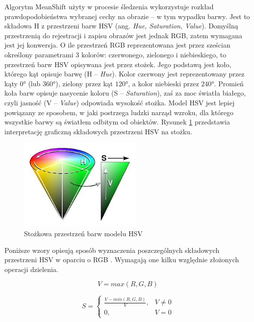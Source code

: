 Algorytm MeanShift użyty w procesie śledzenia wykorzystuje rozkład prawdopodobieństwa wybranej cechy na obrazie -- w tym wypadku barwy. 
Jest to składowa H z przestrzeni barw HSV (ang. \textit{Hue, Saturation, Value}). 
Domyślną przestrzenią do rejestracji i zapisu obrazów jest jednak RGB, zatem wymagana jest jej konwersja. 
O ile przestrzeń RGB reprezentowana jest przez sześcian określony parametrami 3 kolorów: czerwonego, zielonego i niebieskiego, to przestrzeń barw HSV opisywana jest przez stożek. 
Jego podstawą jest koło, którego kąt opisuje barwę (H -- \textit{Hue}). %
Kolor czerwony jest reprezentowany przez kąty $0$\si{\degree} (lub $360$\si{\degree}), zielony przez kąt $120$\si{\degree}, a kolor niebieski przez $240$\si{\degree}. 
Promień koła barw opisuje nasycenie koloru (S -- \textit{Saturation}), zaś za moc światła białego, czyli jasność (V -- \textit{Value}) odpowiada wysokość stożka. 
Model HSV jest lepiej powiązany ze sposobem, w jaki postrzega ludzki narząd wzroku, dla którego wszystkie barwy są światłem odbitym od obiektów.
Rysunek \ref{fig:HSV_cone} przedstawia interpretację graficzną składowych przestrzeni HSV na stożku.

\begin{figure}[h]
	\centering
	\includegraphics[width=6cm]{2_HSV.jpg}
	\caption{Stożkowa przestrzeń barw modelu HSV \cite{HSV}} %
	\label{fig:HSV_cone}
\end{figure}

Poniższe wzory opisują sposób wyznaczenia poszczególnych składowych przestrzeni HSV w oparciu o RGB \cite{Kryjak}. Wymagają one kilku względnie złożonych operacji dzielenia.

\begin{equation}
\label{HSV_first}
V=max(R,G,B)
\end{equation}

\begin{equation}
S=\begin{cases}
\frac{V-min(R,G,B)}{V}, & V\neq0 \\
0, & V=0
\end{cases}
\end{equation}

